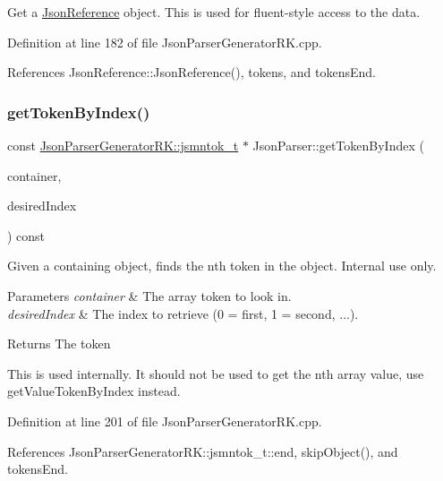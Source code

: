 Get a \hyperlink{class_json_reference}{Json\+Reference} object. This is used for fluent-\/style access to the data. 



Definition at line 182 of file Json\+Parser\+Generator\+R\+K.\+cpp.



References Json\+Reference\+::\+Json\+Reference(), tokens, and tokens\+End.

\mbox{\label{class_json_parser_a588d9c4fcfe9179db67ca42f5ba5229d}} 
\subsubsection{\texorpdfstring{get\+Token\+By\+Index()}{getTokenByIndex()}}
{\footnotesize\ttfamily const \hyperlink{struct_json_parser_generator_r_k_1_1jsmntok__t}{Json\+Parser\+Generator\+R\+K\+::jsmntok\+\_\+t} $\ast$ Json\+Parser\+::get\+Token\+By\+Index (\begin{DoxyParamCaption}\item[{const \hyperlink{struct_json_parser_generator_r_k_1_1jsmntok__t}{Json\+Parser\+Generator\+R\+K\+::jsmntok\+\_\+t} $\ast$}]{container,  }\item[{size\+\_\+t}]{desired\+Index }\end{DoxyParamCaption}) const}



Given a containing object, finds the nth token in the object. Internal use only. 


\begin{DoxyParams}{Parameters}
{\em container} & The array token to look in.\\
\hline
{\em desired\+Index} & The index to retrieve (0 = first, 1 = second, ...).\\
\hline
\end{DoxyParams}
\begin{DoxyReturn}{Returns}
The token
\end{DoxyReturn}
This is used internally. It should not be used to get the nth array value, use get\+Value\+Token\+By\+Index instead. 

Definition at line 201 of file Json\+Parser\+Generator\+R\+K.\+cpp.



References Json\+Parser\+Generator\+R\+K\+::jsmntok\+\_\+t\+::end, skip\+Object(), and tokens\+End.



